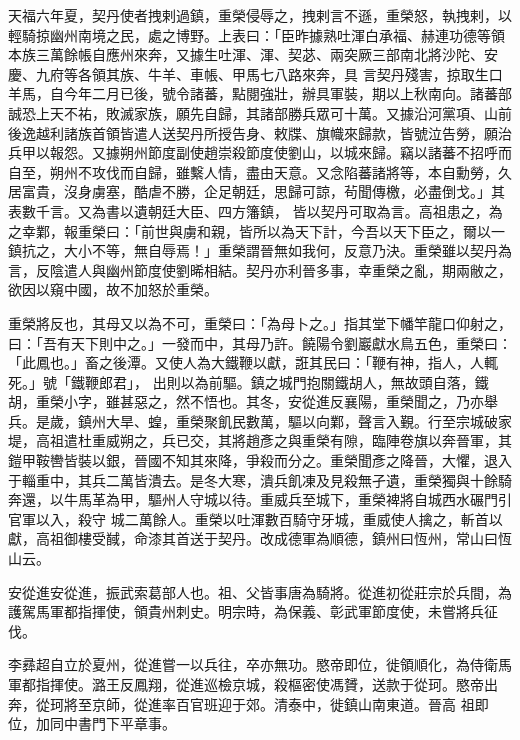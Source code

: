 \begin{pinyinscope}
 天福六年夏，契丹使者拽剌過鎮，重榮侵辱之，拽剌言不遜，重榮怒，執拽剌，以輕騎掠幽州南境之民，處之博野。上表曰：「臣昨據熟吐渾白承福、赫連功德等領本族三萬餘帳自應州來奔，又據生吐渾、渾、契苾、兩突厥三部南北將沙陀、安慶、九府等各領其族、牛羊、車帳、甲馬七八路來奔，具
 言契丹殘害，掠取生口羊馬，自今年二月已後，號令諸蕃，點閱強壯，辦具軍裝，期以上秋南向。諸蕃部誠恐上天不祐，敗滅家族，願先自歸，其諸部勝兵眾可十萬。又據沿河黨項、山前後逸越利諸族首領皆遣人送契丹所授告身、敕牒、旗幟來歸款，皆號泣告勞，願治兵甲以報怨。又據朔州節度副使趙崇殺節度使劉山，以城來歸。竊以諸蕃不招呼而自至，朔州不攻伐而自歸，雖繫人情，盡由天意。又念陷蕃諸將等，本自勳勞，久居富貴，沒身虜塞，酷虐不勝，企足朝廷，思歸可諒，茍聞傳檄，必盡倒戈。」其表數千言。又為書以遺朝廷大臣、四方籓鎮，
 皆以契丹可取為言。高祖患之，為之幸鄴，報重榮曰：「前世與虜和親，皆所以為天下計，今吾以天下臣之，爾以一鎮抗之，大小不等，無自辱焉！」重榮謂晉無如我何，反意乃決。重榮雖以契丹為言，反陰遣人與幽州節度使劉晞相結。契丹亦利晉多事，幸重榮之亂，期兩敝之，欲因以窺中國，故不加怒於重榮。



 重榮將反也，其母又以為不可，重榮曰：「為母卜之。」指其堂下幡竿龍口仰射之，曰：「吾有天下則中之。」一發而中，其母乃許。饒陽令劉巖獻水鳥五色，重榮曰：「此鳳也。」畜之後潭。又使人為大鐵鞭以獻，誑其民曰：「鞭有神，指人，人輒死。」號「鐵鞭郎君」，
 出則以為前驅。鎮之城門抱關鐵胡人，無故頭自落，鐵胡，重榮小字，雖甚惡之，然不悟也。其冬，安從進反襄陽，重榮聞之，乃亦舉兵。是歲，鎮州大旱、蝗，重榮聚飢民數萬，驅以向鄴，聲言入覲。行至宗城破家堤，高祖遣杜重威朔之，兵已交，其將趙彥之與重榮有隙，臨陣卷旗以奔晉軍，其鎧甲鞍轡皆裝以銀，晉國不知其來降，爭殺而分之。重榮聞彥之降晉，大懼，退入于輜重中，其兵二萬皆潰去。是冬大寒，潰兵飢凍及見殺無孑遺，重榮獨與十餘騎奔還，以牛馬革為甲，驅州人守城以待。重威兵至城下，重榮裨將自城西水碾門引官軍以入，殺守
 城二萬餘人。重榮以吐渾數百騎守牙城，重威使人擒之，斬首以獻，高祖御樓受馘，命漆其首送于契丹。改成德軍為順德，鎮州曰恆州，常山曰恆山云。



 安從進安從進，振武索葛部人也。祖、父皆事唐為騎將。從進初從莊宗於兵間，為護駕馬軍都指揮使，領貴州刺史。明宗時，為保義、彰武軍節度使，未嘗將兵征伐。



 李彞超自立於夏州，從進嘗一以兵往，卒亦無功。愍帝即位，徙領順化，為侍衛馬軍都指揮使。潞王反鳳翔，從進巡檢京城，殺樞密使馮贇，送款于從珂。愍帝出奔，從珂將至京師，從進率百官班迎于郊。清泰中，徙鎮山南東道。晉高
 祖即位，加同中書門下平章事。




\end{pinyinscope}

